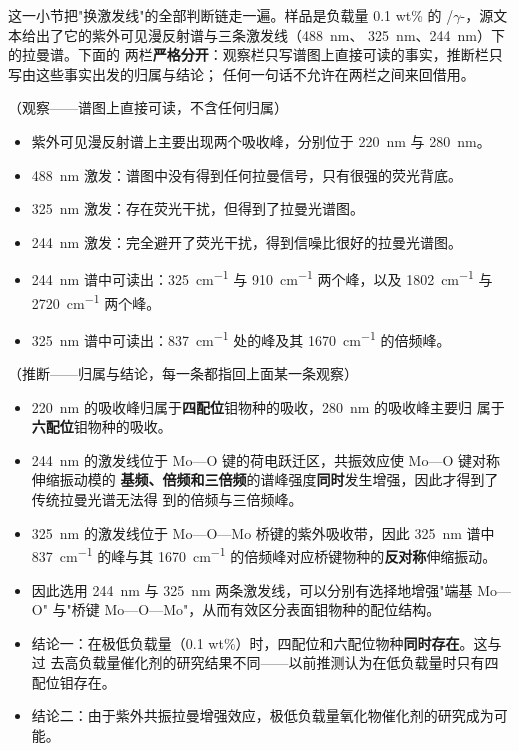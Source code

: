 这一小节把"换激发线"的全部判断链走一遍。样品是负载量 \num{0.1} wt\% 的
/$\gamma$-，源文本给出了它的紫外可见漫反射谱与三条激发线（\qty{488}{nm}、
\qty{325}{nm}、\qty{244}{nm}）下的拉曼谱。下面的
两栏\textbf{严格分开}：观察栏只写谱图上直接可读的事实，推断栏只写由这些事实出发的归属与结论；
任何一句话不允许在两栏之间来回借用。

\begin{obs}
（观察——谱图上直接可读，不含任何归属）
\begin{itemize}
\item 紫外可见漫反射谱上主要出现两个吸收峰，分别位于 \qty{220}{nm} 与 \qty{280}{nm}。
\item \qty{488}{nm} 激发：谱图中没有得到任何拉曼信号，只有很强的荧光背底。
\item \qty{325}{nm} 激发：存在荧光干扰，但得到了拉曼光谱图。
\item \qty{244}{nm} 激发：完全避开了荧光干扰，得到信噪比很好的拉曼光谱图。
\item \qty{244}{nm} 谱中可读出：\qty{325}{cm^{-1}} 与 \qty{910}{cm^{-1}} 两个峰，以及
  \qty{1802}{cm^{-1}} 与 \qty{2720}{cm^{-1}} 两个峰。
\item \qty{325}{nm} 谱中可读出：\qty{837}{cm^{-1}} 处的峰及其 \qty{1670}{cm^{-1}} 的倍频峰。
\end{itemize}
\end{obs}

\begin{infer}
（推断——归属与结论，每一条都指回上面某一条观察）
\begin{itemize}
\item \qty{220}{nm} 的吸收峰归属于\textbf{四配位}钼物种的吸收，\qty{280}{nm} 的吸收峰主要归
  属于\textbf{六配位}钼物种的吸收。
\item \qty{244}{nm} 的激发线位于 Mo—O 键的荷电跃迁区，共振效应使 Mo—O 键对称伸缩振动模的
  \textbf{基频、倍频和三倍频}的谱峰强度\textbf{同时}发生增强，因此才得到了传统拉曼光谱无法得
  到的倍频与三倍频峰。
\item \qty{325}{nm} 的激发线位于 Mo—O—Mo 桥键的紫外吸收带，因此 \qty{325}{nm} 谱中
  \qty{837}{cm^{-1}} 的峰与其 \qty{1670}{cm^{-1}} 的倍频峰对应桥键物种的\textbf{反对称}伸缩振动。
\item 因此选用 \qty{244}{nm} 与 \qty{325}{nm} 两条激发线，可以分别有选择地增强"端基 Mo—O"
  与"桥键 Mo—O—Mo"，从而有效区分表面钼物种的配位结构。
\item 结论一：在极低负载量（\num{0.1} wt\%）时，四配位和六配位物种\textbf{同时存在}。这与过
  去高负载量催化剂的研究结果不同——以前推测认为在低负载量时只有四配位钼存在。
\item 结论二：由于紫外共振拉曼增强效应，极低负载量氧化物催化剂的研究成为可能。
\end{itemize}
\end{infer}

